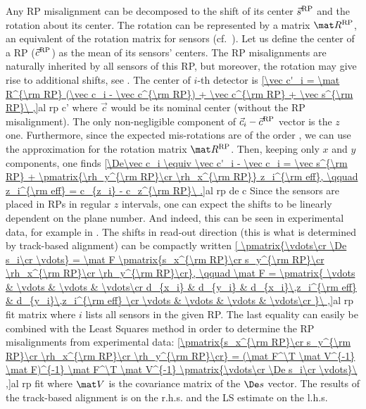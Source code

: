 
Any RP misalignment can be decomposed to the shift of its center $\vec s^{\rm RP}$ and the rotation about its center. The rotation can be represented by a matrix $\mat R^{\rm RP}$, an equivalent of the rotation matrix for sensors (cf.~). Let us define the center of a RP ($\vec c^{\rm RP}$) as the mean of its sensors' centers. The RP misalignments are naturally inherited by all sensors of this RP, but moreover, the rotation may give rise to additional shifts, see . The center of $i$-th detector is
\eqref{\vec c'_i = \mat R^{\rm RP} (\vec c_i - \vec c^{\rm RP}) + \vec c^{\rm RP} + \vec s^{\rm RP}\ ,}{al rp c'}
where $\vec c$ would be its nominal center (without the RP misalignment). The only non-negligible component of $\vec c_i - \vec c^{\rm RP}$ vector is the $z$ one. Furthermore, since the expected mis-rotations are of the order , we can use the approximation  for the rotation matrix $\mat R^{\rm RP}$. Then, keeping only $x$ and $y$ components, one finds
\eqref{\De\vec c_i \equiv \vec c'_i - \vec c_i = \vec s^{\rm RP} + \pmatrix{\rh_y^{\rm RP}\cr \rh_x^{\rm RP}} z_i^{\rm eff}, \qquad z_i^{\rm eff} = c_{z_i} - c_z^{\rm RP}\ .}{al rp de c}
Since the sensors are placed in RPs in regular $z$ intervals, one can expect the shifts to be linearly dependent on the plane number. And indeed, this can be seen in experimental data, for example in . The shifts in read-out direction (this is what is determined by track-based alignment) can be compactly written
\eqref{
\pmatrix{\vdots\cr \De s_i\cr \vdots} = \mat F \pmatrix{s_x^{\rm RP}\cr s_y^{\rm RP}\cr \rh_x^{\rm RP}\cr \rh_y^{\rm RP}\cr}, \qquad
\mat F = \pmatrix{
\vdots & \vdots & \vdots & \vdots\cr
d_{x_i} & d_{y_i} & d_{x_i}\,z_i^{\rm eff} & d_{y_i}\,z_i^{\rm eff} \cr
\vdots & \vdots & \vdots & \vdots\cr
}\ ,}{al rp fit matrix}
where $i$ lists all sensors in the given RP. The last equality can easily be combined with the Least Squares method in order to determine the RP misalignments from experimental data:
\eqref{\pmatrix{s_x^{\rm RP}\cr s_y^{\rm RP}\cr \rh_x^{\rm RP}\cr \rh_y^{\rm RP}\cr} = (\mat F^\T \mat V^{-1} \mat F)^{-1} \mat F^\T \mat V^{-1} \pmatrix{\vdots\cr \De s_i\cr \vdots}\ ,}{al rp fit}
where $\mat V$ is the covariance matrix of the $\De s$ vector. The results of the track-based alignment is on the r.h.s. and the LS estimate on the l.h.s. 

